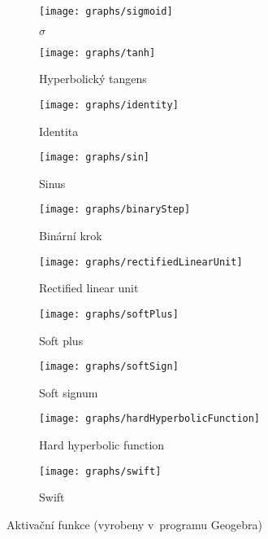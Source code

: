 \documentclass[12pt]{report}			%
\begin{document}
\begin{itemize}
				\begin{figure}
				    \centering
				    \begin{subfigure}[b]{0.3\textwidth}
				        \texttt{[image: graphs/sigmoid]}
				        \caption{$\sigma$}
				    \end{subfigure}
				    \begin{subfigure}[b]{0.3\textwidth}
				        \texttt{[image: graphs/tanh]}
				        \caption{Hyperbolický tangens}
				    \end{subfigure}
				    \begin{subfigure}[b]{0.3\textwidth}
				        \texttt{[image: graphs/identity]}
				        \caption{Identita}
				    \end{subfigure}
				    \begin{subfigure}[b]{0.3\textwidth}
				        \texttt{[image: graphs/sin]}
				        \caption{Sinus}
				    \end{subfigure}
				    \begin{subfigure}[b]{0.3\textwidth}
				        \texttt{[image: graphs/binaryStep]}
				        \caption{Binární krok}
				    \end{subfigure}
				    \begin{subfigure}[b]{0.3\textwidth}
				        \texttt{[image: graphs/rectifiedLinearUnit]}
				        \caption{Rectified linear unit}
				    \end{subfigure}
				    \begin{subfigure}[b]{0.3\textwidth}
				        \texttt{[image: graphs/softPlus]}
				        \caption{Soft plus}
				    \end{subfigure}
				    \begin{subfigure}[b]{0.3\textwidth}
				        \texttt{[image: graphs/softSign]}
				        \caption{Soft signum}
				    \end{subfigure}
				    \begin{subfigure}[b]{0.3\textwidth}
				        \texttt{[image: graphs/hardHyperbolicFunction]}
				        \caption{Hard hyperbolic function}
				    \end{subfigure}
				    \begin{subfigure}[b]{0.3\textwidth}
				        \texttt{[image: graphs/swift]}
				        \caption{Swift}
				    \end{subfigure}
				    \caption{Aktivační funkce (vyrobeny v~programu Geogebra)}
				\end{figure}
						
				\end{itemize}
				
\end{document}
